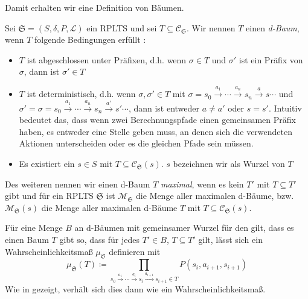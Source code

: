 Damit erhalten wir eine Definition von Bäumen.
\begin{definition}[d-Bäume]
	Sei $\mathfrak{S}=(S,\delta,P,\mathcal{L})$ ein RPLTS und sei $T\subseteq \mathcal{C}_\mathfrak{S}$. Wir nennen $T$ einen \textit{d-Baum}, wenn $T$ folgende Bedingungen erfüllt \cite{cleaveland2005probabilistic}:
	\begin{itemize}
		\item $T$ ist abgeschlossen unter Präfixen, d.h. wenn $\sigma \in T$ und $\sigma'$ ist ein Präfix von $\sigma$, dann ist $\sigma'\in T$
		\item $T$ ist deterministisch, d.h. wenn $\sigma,\sigma'\in T$ mit $\sigma = s_0\xrightarrow{a_1}\cdots \xrightarrow{a_n}s_n\xrightarrow{a}s\cdots$ und $\sigma' = \sigma = s_0\xrightarrow{a_1}\cdots \xrightarrow{a_n}s_n\xrightarrow{a'}s'\cdots$, dann ist entweder $a\neq a'$ oder $s=s'$. Intuitiv bedeutet das, dass wenn zwei Berechnungspfade einen gemeinsamen Präfix haben, es entweder eine Stelle geben muss, an denen sich die verwendeten Aktionen unterscheiden oder es die gleichen Pfade sein müssen.
		\item Es existiert ein $s\in S$ mit $T\subseteq \mathcal{C}_\mathfrak{S}(s)$. $s$ bezeichnen wir als Wurzel von $T$
	\end{itemize}
	Des weiteren nennen wir einen d-Baum $T$ \textit{maximal}, wenn es kein $T'$ mit $T\subseteq T'$ gibt und für ein RPLTS $\mathfrak{S}$ ist $\mathcal{M}_{\mathfrak{S}}$ die Menge aller maximalen d-Bäume, bzw. $\mathcal{M}_{\mathfrak{S}}(s)$ die Menge aller maximalen d-Bäume $T$ mit $T\subseteq \mathcal{C}_\mathfrak{S}(s)$. \cite{cleaveland2005probabilistic}
\end{definition}

Für eine Menge $B$ an d-Bäumen mit gemeinsamer Wurzel für den gilt, dass es einen Baum $T$ gibt so, dass für jedes $T'\in B$, $T\subseteq T'$ gilt, lässt sich ein Wahrscheinlichkeitsmaß $\mu_\mathfrak{S}$ definieren mit 
$$
\mu_\mathfrak{S}(T)\coloneqq \prod_{s_0\xrightarrow{a_1}\cdots \xrightarrow{a_i}s_i\xrightarrow{a_{i+1}}s_{i+1}\in T} P(s_i,a_{i+1},s_{i+1})
$$
Wie in \cite{cleaveland2005probabilistic} gezeigt, verhält sich dies dann wie ein Wahrscheinlichkeitsmaß.

